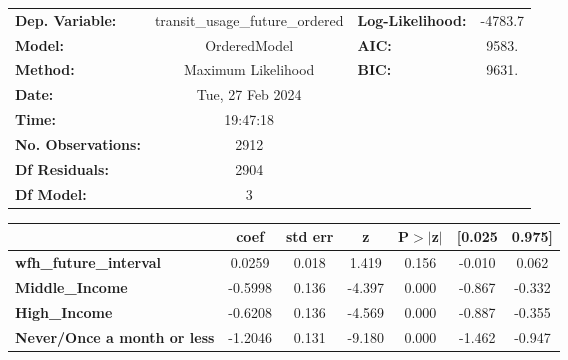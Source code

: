 \documentclass{report}
\begin{document}
\begin{center}
\begin{tabular}{lclc}
\toprule
\textbf{Dep. Variable:}                           & transit\_usage\_future\_ordered & \textbf{  Log-Likelihood:    } &   -4783.7   \\
\textbf{Model:}                                   &           OrderedModel          & \textbf{  AIC:               } &     9583.   \\
\textbf{Method:}                                  &        Maximum Likelihood       & \textbf{  BIC:               } &     9631.   \\
\textbf{Date:}                                    &         Tue, 27 Feb 2024        & \textbf{                     } &             \\
\textbf{Time:}                                    &             19:47:18            & \textbf{                     } &             \\
\textbf{No. Observations:}                        &                2912             & \textbf{                     } &             \\
\textbf{Df Residuals:}                            &                2904             & \textbf{                     } &             \\
\textbf{Df Model:}                                &                   3             & \textbf{                     } &             \\
\bottomrule
\end{tabular}
\begin{tabular}{lcccccc}
                                                  & \textbf{coef} & \textbf{std err} & \textbf{z} & \textbf{P$> |$z$|$} & \textbf{[0.025} & \textbf{0.975]}  \\
\midrule
\textbf{wfh\_future\_interval}                    &       0.0259  &        0.018     &     1.419  &         0.156        &       -0.010    &        0.062     \\
\textbf{Middle\_Income}                           &      -0.5998  &        0.136     &    -4.397  &         0.000        &       -0.867    &       -0.332     \\
\textbf{High\_Income}                             &      -0.6208  &        0.136     &    -4.569  &         0.000        &       -0.887    &       -0.355     \\
\textbf{Never/Once a month or less}               &      -1.2046  &        0.131     &    -9.180  &         0.000        &       -1.462    &       -0.947     \\

\end{tabular}
\end{center}
\end{document}
